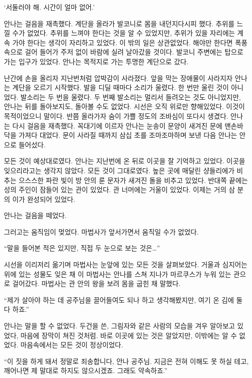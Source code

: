 `서둘러야 해. 시간이 얼마 없어.'

안나는 걸음을 재촉했다. 계단을 올라가 발코니로 몸을 내던지다시피 했다. 추위를 느낄 수가 없었다. 추위를 느껴야 한다는 것을 알 수 있었지만, 추위가 있을 자리에는 계속 가야 한다는 생각이 자리하고 있었다. 이 밖의 일은 상관없었다. 해야만 한다면 폭풍 속으로 걸어 들어가 주저 없이 바람에 실려 날아갔을 것이다. 발코니 주변에는 탑으로 가는 입구가 있었다. 안나는 목적지로 가는 투명한 계단으로 갔다.

난간에 손을 올리자 지난번처럼 압박감이 사라졌다. 앞을 막는 장애물이 사라지자 안나는 계단을 오르기 시작했다. 발을 디딜 때마다 소리가 울렸다. 한 번만 울린 것이 아니었다. 발소리는 두 번을 울렸다. 두 번째 발소리는 멀리서 들려오는 것도 아니었지만, 안나는 뒤를 돌아보지도, 돌아볼 수도 없었다. 시선은 오직 위로만 향해있었다. 이것이 목적이었으니 말이다. 반쯤 올라가자 숨이 가쁠 정도의 조바심이 또다시 생겼다. 안나는 다시 걸음을 재촉했다. 꼭대기에 이르자 안나는 눈송이 문양이 새겨진 문에 맨손바닥을 가져다 대었다. 문이 사라질 때까지 삼십 초를 조마조마하며 보낸 다음 안나는 안으로 들어섰다.

모든 것이 예상대로였다. 안나는 지난번에 온 뒤로 이곳을 잘 기억하고 있었다. 이곳을 잊으리라고는 생각지 않았다. 모든 것이 그대로였다. 높은 곳에 매달린 샹들리에가 비추는 으스스한 파란 빛이 방 안의 룬 문자가 새겨진 돌을 비추고 있었다. 반대쪽 끝에는 성의 주인이 잠들어 있는 관이 있었다. 관 너머에는 거울이 있었다. 이제는 거의 삼 분의 이가 완성되어 있었다.

안나는 걸음을 떼었다.

그러고는 움직임이 멎었다. 마법사가 앞서가면서 움직일 수가 없었다.

``말을 들어본 적은 있지만, 직접 두 눈으로 보는 것은\ldots''

시선을 이리저리 옮기며 마법사는 눈앞에 있는 모든 것을 살펴보았다. 거울과 심지어는 위에 있는 성물도 잊은 채 이 마법사는 안나를 스쳐 지나가 마르쿠스가 누워 있는 관으로 걸어갔다. 마법사는 관 안의 왕을 보려 몸을 굽힌 채 말했다.

``제가 살아야 하는 데 공주님을 끌어들여도 되나 하고 생각해봤지만, 여기 온 김에 둘 다 하죠.''

안나는 말을 할 수 없었다. 두건을 쓴, 그림자와 같은 사람의 모습을 겨우 알아보고 있었다, 마음에 장막이 쳐진 것처럼. 바로 이곳에 있는 것은 알았지만, 이밖에는 알 수 없었다. 마음속에서는 모든 것이 정상이었다.

``이 짓을 하게 돼서 정말로 죄송합니다, 안나 공주님. 지금은 전혀 이해도 못 하실 테고, 깨어나면 제 말대로 하지도 않으시겠죠. 그래도 약속하죠.''


